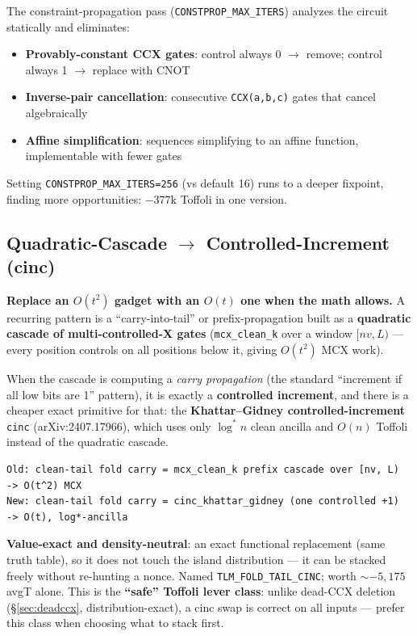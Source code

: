 \documentclass[11pt,a4paper]{article}
\begin{document}
The constraint-propagation pass (\texttt{CONSTPROP\_MAX\_ITERS}) analyzes the circuit statically
and eliminates:
\begin{itemize}
  \item \textbf{Provably-constant CCX gates}: control always 0 $\to$ remove; control always 1
    $\to$ replace with CNOT
  \item \textbf{Inverse-pair cancellation}: consecutive \texttt{CCX(a,b,c)} gates that cancel
    algebraically
  \item \textbf{Affine simplification}: sequences simplifying to an affine function, implementable
    with fewer gates
\end{itemize}

Setting \texttt{CONSTPROP\_MAX\_ITERS=256} (vs default 16) runs to a deeper fixpoint, finding
more opportunities: $-377$k Toffoli in one version.

\subsection{Quadratic-Cascade $\to$ Controlled-Increment (cinc)}
\label{sec:cinc}

\textbf{Replace an $O(t^2)$ gadget with an $O(t)$ one when the math allows.} A recurring pattern is
a ``carry-into-tail'' or prefix-propagation built as a \textbf{quadratic cascade of
multi-controlled-X gates} (\lstinline{mcx_clean_k} over a window $[nv, L)$ --- every position
controls on all positions below it, giving $O(t^2)$ MCX work).

When the cascade is computing a \emph{carry propagation} (the standard ``increment if all low bits
are 1'' pattern), it is exactly a \textbf{controlled increment}, and there is a cheaper exact
primitive for that: the \textbf{Khattar--Gidney controlled-increment} \texttt{cinc}
(arXiv:2407.17966), which uses only $\log^* n$ clean ancilla and $O(n)$ Toffoli instead of the
quadratic cascade.

\begin{lstlisting}
Old: clean-tail fold carry = mcx_clean_k prefix cascade over [nv, L)   -> O(t^2) MCX
New: clean-tail fold carry = cinc_khattar_gidney (one controlled +1)   -> O(t), log*-ancilla
\end{lstlisting}

\textbf{Value-exact and density-neutral}: an exact functional replacement (same truth table), so it
does not touch the island distribution --- it can be stacked freely without re-hunting a nonce.
Named \texttt{TLM\_FOLD\_TAIL\_CINC}; worth $\sim$$-5{,}175$ avgT alone. This is the \textbf{``safe''
Toffoli lever class}: unlike dead-CCX deletion (\S\ref{sec:deadccx}, distribution-exact), a cinc swap
is correct on all inputs --- prefer this class when choosing what to stack first.
\end{document}
